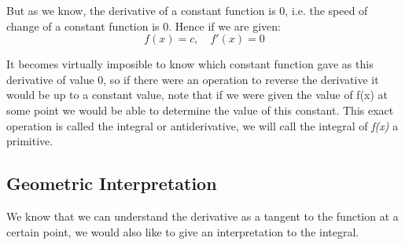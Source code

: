 \documentclass[11pt]{article}
\begin{document}
But as we know, the derivative of a constant function is 0, i.e. the speed of
change of a constant function is 0. Hence if we are given: 
\[ 
f(x) = c, \quad f'(x) = 0 
\] 

It becomes virtually imposible to know which constant function gave
as this derivative of value 0, so if there were an operation to reverse the
derivative it would be up to a constant value, note that if we were given the
value of f(x) at some point we would be able to determine the value of this
constant. This exact operation is called the integral or antiderivative, we will
call the integral of \emph{f(x)} a primitive.

\subsection{Geometric Interpretation}
\label{sec:orgec7a522}
We know that we can understand the derivative as a tangent to the function at a
certain point, we would also like to give an interpretation to the integral. 
\end{document}
